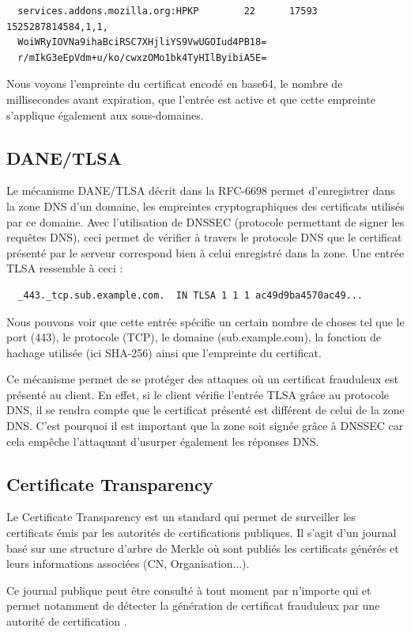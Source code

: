 \begin{verbatim}
  services.addons.mozilla.org:HPKP        22      17593   1525287814584,1,1,
  WoiWRyIOVNa9ihaBciRSC7XHjliYS9VwUGOIud4PB18=
  r/mIkG3eEpVdm+u/ko/cwxzOMo1bk4TyHIlByibiA5E=
\end{verbatim}

Nous voyons l'empreinte du certificat encodé en base64, le nombre de millisecondes avant expiration, que l'entrée est active et que cette empreinte s'applique également aux sous-domaines.

\subsection{DANE/TLSA}

Le mécanisme DANE/TLSA décrit dans la RFC-6698 permet d'enregistrer dans la zone DNS d'un domaine, les empreintes cryptographiques des certificats utilisés par ce domaine. Avec l'utilisation de DNSSEC (protocole permettant de signer les requêtes DNS), ceci permet de vérifier à travers le protocole DNS que le certificat présenté par le serveur correspond bien à celui enregistré dans la zone. Une entrée TLSA ressemble à ceci :

\begin{verbatim}
  _443._tcp.sub.example.com.  IN TLSA 1 1 1 ac49d9ba4570ac49...
\end{verbatim}

Nous pouvons voir que cette entrée spécifie un certain nombre de choses tel que le port (443), le protocole (TCP), le domaine (sub.example.com), la fonction de hachage utilisée (ici SHA-256) ainsi que l'empreinte du certificat.

Ce mécanisme permet de se protéger des attaques où un certificat frauduleux est présenté au client. En effet, si le client vérifie l'entrée TLSA grâce au protocole DNS, il se rendra compte que le certificat présenté est différent de celui de la zone DNS. C'est pourquoi il est important que la zone soit signée grâce à DNSSEC car cela empêche l'attaquant d'usurper également les réponses DNS.

\subsection{Certificate Transparency}

Le Certificate Transparency est un standard qui permet de surveiller les certificats émis par les autorités de certifications publiques. Il s'agit d'un journal basé sur une structure d'arbre de Merkle où sont publiés les certificats générés et leurs informations associées (CN, Organisation...).

Ce journal publique peut être consulté à tout moment par n'importe qui et permet notamment de détecter la génération de certificat frauduleux par une autorité de certification \cite{certificate-transparency}.